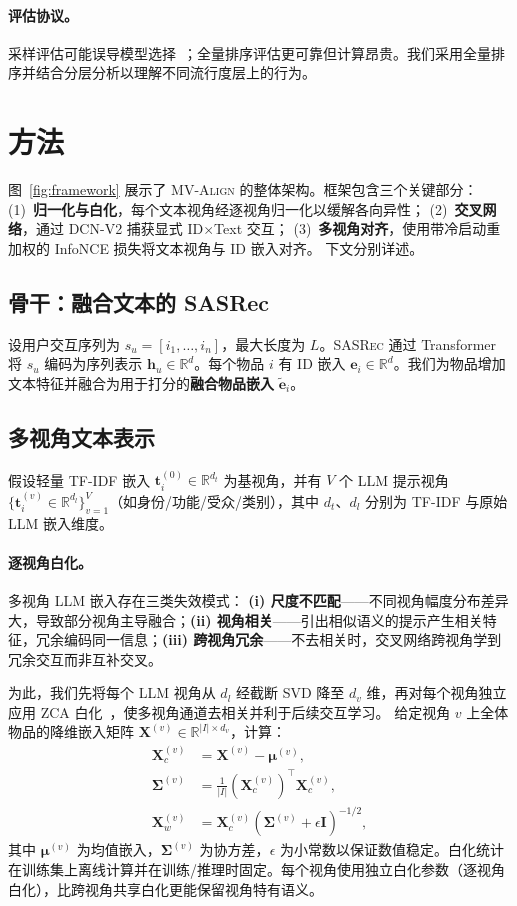 \documentclass[sigconf,natbib=true,anonymous]{acmart}
\newcommand{\model}{\textsc{MV-Align}\xspace}
\newcommand{\base}{\textsc{SASRec}\xspace}
\newcommand{\tfidf}{\textsc{TF-IDF}\xspace}
\newcommand{\llm}{\textsc{LLM}\xspace}
\begin{document}
\paragraph{评估协议。}
采样评估可能误导模型选择~\cite{krichene2020sampledmetrics}；全量排序评估更可靠但计算昂贵。我们采用全量排序并结合分层分析以理解不同流行度层上的行为。

\section{方法}
图~\ref{fig:framework} 展示了 \model 的整体架构。框架包含三个关键部分：
(1)~\textbf{归一化与白化}，每个文本视角经逐视角归一化以缓解各向异性；
(2)~\textbf{交叉网络}，通过 DCN-V2 捕获显式 ID$\times$Text 交互；
(3)~\textbf{多视角对齐}，使用带冷启动重加权的 InfoNCE 损失将文本视角与 ID 嵌入对齐。
下文分别详述。

\subsection{骨干：融合文本的 SASRec}
设用户交互序列为 $s_u = [i_1,\dots,i_n]$，最大长度为 $L$。\base 通过 Transformer 将 $s_u$ 编码为序列表示 $\mathbf{h}_u \in \mathbb{R}^d$。每个物品 $i$ 有 ID 嵌入 $\mathbf{e}_i \in \mathbb{R}^d$。我们为物品增加文本特征并融合为用于打分的\textbf{融合物品嵌入} $\tilde{\mathbf{e}}_i$。

\subsection{多视角文本表示}\label{sec:whiten}
假设轻量 \tfidf 嵌入 $\mathbf{t}_i^{(0)} \in \mathbb{R}^{d_t}$ 为基视角，并有 $V$ 个 \llm 提示视角 $\{\mathbf{t}_i^{(v)} \in \mathbb{R}^{d_l}\}_{v=1}^V$（如身份/功能/受众/类别），其中 $d_t$、$d_l$ 分别为 \tfidf 与原始 \llm 嵌入维度。

\paragraph{逐视角白化。}
多视角 \llm 嵌入存在三类失效模式：
\textbf{(i) 尺度不匹配}——不同视角幅度分布差异大，导致部分视角主导融合；\textbf{(ii) 视角相关}——引出相似语义的提示产生相关特征，冗余编码同一信息；\textbf{(iii) 跨视角冗余}——不去相关时，交叉网络跨视角学到冗余交互而非互补交叉。

为此，我们先将每个 \llm 视角从 $d_l$ 经截断 SVD 降至 $d_v$ 维，再对每个视角独立应用 ZCA 白化~\cite{kessy2018zca}，使多视角通道去相关并利于后续交互学习。
给定视角 $v$ 上全体物品的降维嵌入矩阵 $\mathbf{X}^{(v)} \in \mathbb{R}^{|I| \times d_v}$，计算：
\begin{align}
  \mathbf{X}_c^{(v)} &= \mathbf{X}^{(v)} - \boldsymbol{\mu}^{(v)}, \\
  \boldsymbol{\Sigma}^{(v)} &= \frac{1}{|I|}(\mathbf{X}_c^{(v)})^\top \mathbf{X}_c^{(v)}, \\
  \mathbf{X}_w^{(v)} &= \mathbf{X}_c^{(v)} (\boldsymbol{\Sigma}^{(v)} + \epsilon \mathbf{I})^{-1/2},
\end{align}
其中 $\boldsymbol{\mu}^{(v)}$ 为均值嵌入，$\boldsymbol{\Sigma}^{(v)}$ 为协方差，$\epsilon$ 为小常数以保证数值稳定。白化统计在训练集上离线计算并在训练/推理时固定。每个视角使用独立白化参数（逐视角白化），比跨视角共享白化更能保留视角特有语义。
\end{document}
